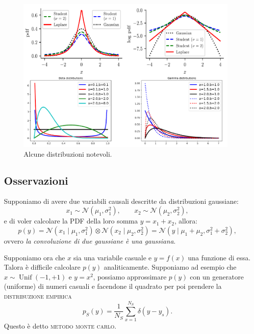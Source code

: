 \documentclass[10pt]{article}
\DeclareMathOperator{\Unif}{Unif}
\newcommand{\im}[1]{\textsc{#1}}
\newcommand{\cond}{\mid}
\newcommand{\pare}[1]{
	\ensuremath{\left(#1\right)}
}
\theoremstyle{definition}
\begin{document}
\begin{figure}
\includegraphics[width=0.98\textwidth]{Images/distributions.PNG}
\caption{Alcune distribuzioni notevoli.}\label{fig:distributions}
\end{figure}

\subsection{Osservazioni}
Supponiamo di avere due variabili causali descritte da distribuzioni gaussiane:
\begin{equation}
x_1 \sim \mathcal{N}\pare{\mu_1, \sigma_1^2},\qquad x_2 \sim \mathcal{N}\pare{\mu_2, \sigma_2^2},
\end{equation}
e di voler calcolare la PDF della loro somma $y = x_1 + x_2$, allora:
\begin{equation}
p\pare{y} = \mathcal{N}\pare{x_1\cond\mu_1, \sigma^2_1} \otimes \mathcal{N}\pare{x_2\cond\mu_2, \sigma^2_2} = \mathcal{N}\pare{y\cond\mu_1 + \mu_2, \sigma^2_1 + \sigma^2_2},
\end{equation}
ovvero \textit{la convoluzione di due gaussiane è una gaussiana}.

Supponiamo ora che $x$ sia una variabile casuale e $y = f\pare{x}$ una funzione di essa. Talora è difficile calcolare $p\pare{y}$ analiticamente. Supponiamo ad esempio che $x\sim\Unif\pare{-1,+1}$ e $y=x^2$, possiamo approssimare $p\pare{y}$ con un generatore (uniforme) di numeri casuali e facendone il quadrato per poi prendere la \im{distribuzione empirica}
\begin{equation}
p_S\pare{y} = \frac{1}{N_S}\sum_{x=1}^{N_S}\delta\pare{y-y_s}.
\end{equation}
Questo è detto \im{metodo monte carlo}.
\end{document}
